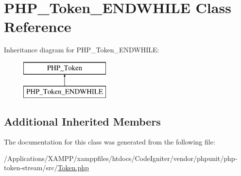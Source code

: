 \hypertarget{class_p_h_p___token___e_n_d_w_h_i_l_e}{}\section{P\+H\+P\+\_\+\+Token\+\_\+\+E\+N\+D\+W\+H\+I\+LE Class Reference}
\label{class_p_h_p___token___e_n_d_w_h_i_l_e}
Inheritance diagram for P\+H\+P\+\_\+\+Token\+\_\+\+E\+N\+D\+W\+H\+I\+LE\+:\begin{figure}[H]
\begin{center}
\leavevmode
\includegraphics[height=2.000000cm]{class_p_h_p___token___e_n_d_w_h_i_l_e}
\end{center}
\end{figure}
\subsection*{Additional Inherited Members}


The documentation for this class was generated from the following file\+:\begin{DoxyCompactItemize}
\item 
/\+Applications/\+X\+A\+M\+P\+P/xamppfiles/htdocs/\+Code\+Igniter/vendor/phpunit/php-\/token-\/stream/src/\mbox{\hyperlink{_token_8php}{Token.\+php}}\end{DoxyCompactItemize}
